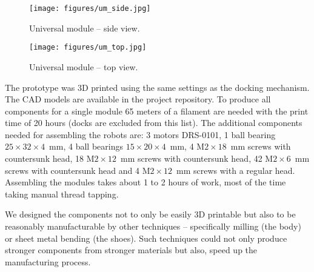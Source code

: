 \begin{figure}[!t]
    \centering
    \texttt{[image: figures/um\_side.jpg]}
    \caption{Universal module -- side view.}
    \label{fig:um_photo_side}
\end{figure}

\begin{figure}[!t]
    \centering
    \texttt{[image: figures/um\_top.jpg]}
    \caption{Universal module -- top view.}
    \label{fig:um_photo_top}
\end{figure}

The prototype was 3D printed using the same settings as the docking mechanism.
The CAD models are available in the project repository. To produce all
components for a single module 65 meters of a filament are needed with the print
time of 20 hours (docks are excluded from this list). The additional components
needed for assembling the robots are: 3 motors DRS-0101, 1 ball bearing
$25\times32\times4$~mm, 4 ball bearings $15\times20\times4$~mm, 4
M$2\times18$~mm screws with countersunk head, 18 M$2\times12$~mm screws with
countersunk head, 42 M$2\times6$~mm screws with countersunk head and 4
M$2\times12$~mm screws with a regular head. Assembling the modules takes about 1
to 2 hours of work, most of the time taking manual thread tapping.

We designed the components not to only be easily 3D printable but also to be
reasonably manufacturable by other techniques -- specifically milling (the body)
or sheet metal bending (the shoes). Such techniques could not only produce
stronger components from stronger materials but also, speed up the
manufacturing process.
